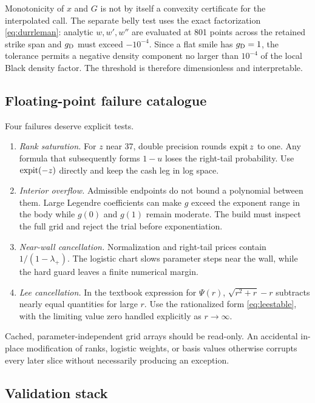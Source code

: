 Monotonicity of $x$ and $G$ is not by itself a convexity certificate for the
interpolated call.  The separate belly test uses the exact factorization
\eqref{eq:durrleman}: analytic $w,w',w''$ are evaluated at 801 points across
the retained strike span and $g_{\rm D}$ must exceed $-10^{-4}$.  Since a flat
smile has $g_{\rm D}=1$, the tolerance permits a negative density component no
larger than $10^{-4}$ of the local Black density factor.  The threshold is
therefore dimensionless and interpretable.

\subsection{Floating-point failure catalogue}

Four failures deserve explicit tests.

\begin{enumerate}
\item \emph{Rank saturation.}  For $z$ near 37, double precision rounds
$\operatorname{expit} z$ to one.  Any formula that subsequently forms $1-u$ loses the
right-tail probability.  Use $\operatorname{expit}(-z)$ directly and keep the cash leg in
log space.
\item \emph{Interior overflow.}  Admissible endpoints do not bound a
polynomial between them.  Large Legendre coefficients can make $g$ exceed the
exponent range in the body while $g(0)$ and $g(1)$ remain moderate.  The build
must inspect the full grid and reject the trial before exponentiation.
\item \emph{Near-wall cancellation.}  Normalization and right-tail prices
contain $1/(1-\lambda_+)$.  The logistic chart slows parameter steps near the
wall, while the hard guard leaves a finite numerical margin.
\item \emph{Lee cancellation.}  In the textbook expression for $\Psi(r)$,
$\sqrt{r^2+r}-r$ subtracts nearly equal quantities for large $r$.  Use the
rationalized form \eqref{eq:leestable}, with the limiting value zero handled
explicitly as $r\to\infty$.
\end{enumerate}

Cached, parameter-independent grid arrays should be read-only.  An accidental
in-place modification of ranks, logistic weights, or basis values otherwise
corrupts every later slice without necessarily producing an exception.

\subsection{Validation stack}

